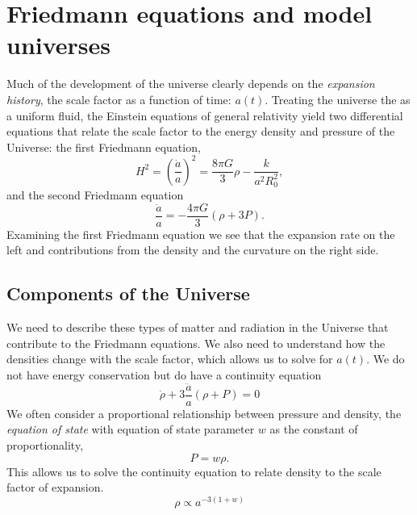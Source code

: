 \section{Friedmann equations and model universes}
Much of the development of the universe clearly depends on the \textit{expansion history}, the scale factor as a function of time: $a(t)$.  Treating the universe the as a uniform fluid, the Einstein equations of general relativity yield two differential equations that relate the scale factor to the energy density and pressure of the Universe: the first Friedmann equation,
\begin{equation}
  H^2 = \left( \frac{\dot a}{a} \right)^2 = \frac{8\pi G}{3} \rho - \frac{k}{a^2 R_0^2}, \label{eqn:friedmann1}
\end{equation}
and the second Friedmann equation
\begin{equation}
  \frac{\ddot a}{a} = -\frac{4 \pi G}{3} (\rho + 3 P) \label{eqn:friedmann2}.
\end{equation}
Examining the first Friedmann equation we see that the expansion rate on the left and contributions from the density and the curvature on the right side.

\subsection{Components of the Universe}
We need to describe these types of matter and radiation in the Universe that contribute to the Friedmann equations.  We also need to understand how the densities change with the scale factor, which allows us to solve for $a(t)$.  We do not have energy conservation but do have a continuity equation
\begin{equation}
  \dot \rho + 3 \frac{\ddot a}{a}(\rho + P) = 0
\end{equation}
We often consider a proportional relationship between pressure and density, the \textit{equation of state} with equation of state parameter $w$ as the constant of proportionality,
\begin{equation}
  P = w \rho.
\end{equation}
This allows us to solve the continuity equation to relate density to the scale factor of expansion.
\begin{equation}
  \rho \propto a^{-3(1+w)}
\end{equation}

